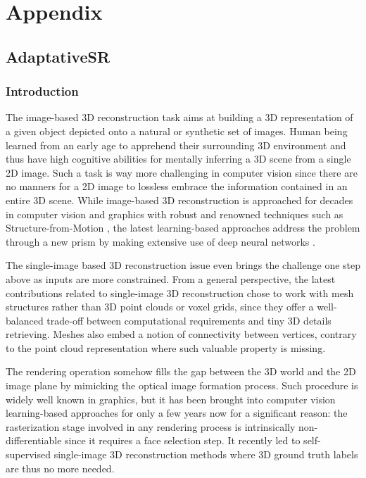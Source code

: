 \chapter{Appendix}
\label{chapter:appendix}

{}



\section{AdaptativeSR}

\subsection{Introduction}
\label{sec:intro}

The image-based 3D reconstruction task aims at building a 3D representation of a given object depicted onto a natural or synthetic set of images. Human being learned from an early age to apprehend their surrounding 3D environment and thus have high cognitive abilities for mentally inferring a 3D scene from a single 2D image. Such a task is way more challenging in computer vision since there are no manners for a 2D image to lossless embrace the information contained in an entire 3D scene. While image-based 3D reconstruction is approached for decades in computer vision and graphics with robust and renowned techniques such as Structure-from-Motion \citep{longuet1981computer}, the latest learning-based approaches address the problem through a new prism by making extensive use of deep neural networks
\citep{kanazawa2018learning,deng2019accurate,saito2020pifuhd}.

The single-image based 3D reconstruction issue even brings the challenge one step above as inputs are more constrained. From a general perspective, the latest contributions related to single-image 3D reconstruction chose to work with mesh structures rather than 3D point clouds or voxel grids, since they offer a well-balanced trade-off between computational requirements and tiny 3D details retrieving. Meshes also embed a notion of connectivity between vertices, contrary to the point cloud representation where such valuable property is missing.

The rendering operation somehow fills the gap between the 3D world and the 2D image plane by mimicking the optical image formation process. Such procedure is widely well known in graphics, but it has been brought into computer vision learning-based approaches for only a few years now for a significant reason: the rasterization stage involved in any rendering process is intrinsically non-differentiable since it requires a face selection step. It recently led to self-supervised single-image 3D reconstruction methods where 3D ground truth labels are thus no more needed.

